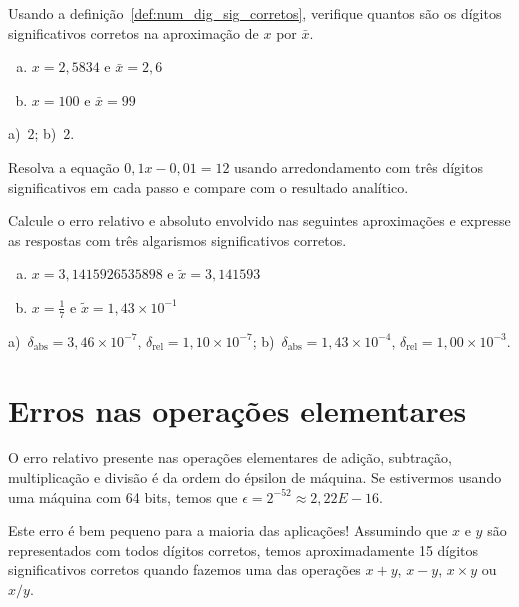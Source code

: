 \begin{exer}
Usando a definição~\ref{def:num_dig_sig_corretos}, verifique quantos são os dígitos significativos corretos na aproximação de $x$ por $\bar{x}$.
\begin{enumerate}[a)]
\item $x=2,5834$ e $\bar{x}=2,6$
\item $x=100$ e $\bar{x}=99$
\end{enumerate}
\end{exer}
\begin{resp}
  a)~$2$; b)~$2$.
\end{resp}

\begin{exer} Resolva a equação $0,1x-0,01=12$ usando arredondamento com três dígitos significativos em cada passo e compare com o resultado analítico.
\end{exer}


\begin{exer} Calcule o erro relativo e absoluto envolvido nas seguintes aproximações e expresse as respostas com três algarismos significativos corretos.
    \begin{enumerate}[a)]
    \item $x=3,1415926535898$ e $\tilde{x}=3,141593$
    \item $x=\frac{1}{7}$ e $\tilde{x}=1,43\times 10^{-1}$
    \end{enumerate}
\end{exer}
\begin{resp}
    a)~$\delta_{\mbox{abs}}=3,46\times 10^{-7}$, $\delta_{\mbox{rel}}=1,10\times 10^{-7}$; b)~$\delta_{\mbox{abs}}=1,43\times 10^{-4}$, $\delta_{\mbox{rel}} = 1,00 \times 10^{-3}$.
\end{resp}



\section{Erros nas operações elementares}
O erro relativo presente nas operações elementares de adição, subtração, multiplicação e divisão é da ordem do épsilon de máquina. Se estivermos usando uma máquina com 64 bits, temos que $\epsilon = 2^{-52} \approx 2,22E-16$. 

Este erro é bem pequeno para a maioria das aplicações! Assumindo que $x$ e $y$ são representados com todos dígitos corretos, temos aproximadamente 15 dígitos significativos corretos quando fazemos uma das operações $x+y$, $x-y$, $x\times y$ ou $x/y$. 

